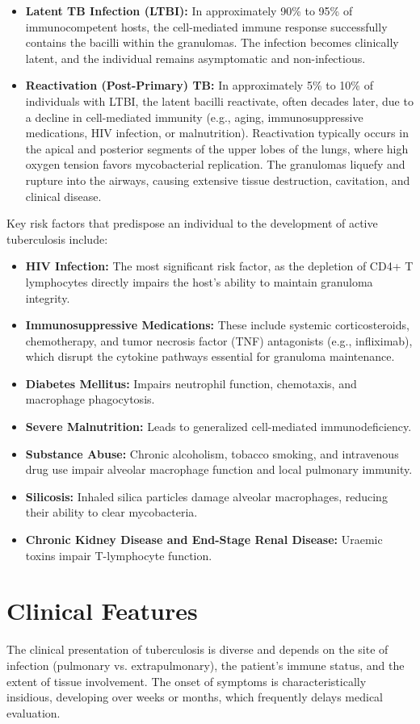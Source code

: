 \begin{itemize}
    \item \textbf{Latent TB Infection (LTBI):} In approximately 90\% to 95\% of immunocompetent hosts, the cell-mediated immune response successfully contains the bacilli within the granulomas. The infection becomes clinically latent, and the individual remains asymptomatic and non-infectious.
    \item \textbf{Reactivation (Post-Primary) TB:} In approximately 5\% to 10\% of individuals with LTBI, the latent bacilli reactivate, often decades later, due to a decline in cell-mediated immunity (e.g., aging, immunosuppressive medications, HIV infection, or malnutrition). Reactivation typically occurs in the apical and posterior segments of the upper lobes of the lungs, where high oxygen tension favors mycobacterial replication. The granulomas liquefy and rupture into the airways, causing extensive tissue destruction, cavitation, and clinical disease.
\end{itemize}

Key risk factors that predispose an individual to the development of active tuberculosis include:
\begin{itemize}
    \item \textbf{HIV Infection:} The most significant risk factor, as the depletion of CD4+ T lymphocytes directly impairs the host's ability to maintain granuloma integrity.
    \item \textbf{Immunosuppressive Medications:} These include systemic corticosteroids, chemotherapy, and tumor necrosis factor (TNF) antagonists (e.g., infliximab), which disrupt the cytokine pathways essential for granuloma maintenance.
    \item \textbf{Diabetes Mellitus:} Impairs neutrophil function, chemotaxis, and macrophage phagocytosis.
    \item \textbf{Severe Malnutrition:} Leads to generalized cell-mediated immunodeficiency.
    \item \textbf{Substance Abuse:} Chronic alcoholism, tobacco smoking, and intravenous drug use impair alveolar macrophage function and local pulmonary immunity.
    \item \textbf{Silicosis:} Inhaled silica particles damage alveolar macrophages, reducing their ability to clear mycobacteria.
    \item \textbf{Chronic Kidney Disease and End-Stage Renal Disease:} Uraemic toxins impair T-lymphocyte function.
\end{itemize}

\section*{Clinical Features}
The clinical presentation of tuberculosis is diverse and depends on the site of infection (pulmonary vs. extrapulmonary), the patient's immune status, and the extent of tissue involvement. The onset of symptoms is characteristically insidious, developing over weeks or months, which frequently delays medical evaluation.

